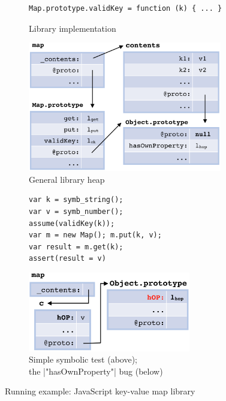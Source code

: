\begin{figure}[t]
\begin{subfigure}[b]{0.33\textwidth}
{\begin{lstlisting}
Map.prototype.validKey = function (k) { ... }
\end{lstlisting}}
\vspace*{-0.2cm}
\caption{Library implementation}
\label{fig:2a}
\end{subfigure}
%
 \begin{subfigure}[b]{0.33\textwidth}
 \includegraphics[width=0.93\textwidth]{figures/mapDiagram.png}
 \vspace*{0.5cm}
 \caption{General library heap}
 \label{fig:2b}
 \end{subfigure}
 \begin{subfigure}[b]{0.3\textwidth}
 \centering 
 {
\begin{lstlisting}
var k = symb_string();
var v = symb_number();
assume(validKey(k));
var m = new Map(); m.put(k, v); 
var result = m.get(k);
assert(result = v)
\end{lstlisting}}
\vspace*{0.1cm}
 \includegraphics[width=0.78\textwidth]{figures/heapfail.png}
 \captionsetup{format=nastyCaption}
\caption{Simple symbolic test (above); \\the \jsinline|"hasOwnProperty"| bug (below)}
\label{fig:2c}
\end{subfigure}
\vspace*{-0.25cm}
\caption{Running example: JavaScript key-value map library}
\label{fig:two}
 \vspace*{-0.4cm}
\end{figure}

